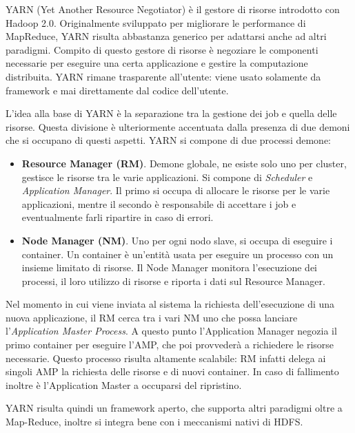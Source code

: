 YARN (Yet Another Resource Negotiator) è il gestore di risorse introdotto con Hadoop 2.0.
Originalmente sviluppato per migliorare le performance di MapReduce, YARN risulta abbastanza generico per adattarsi anche ad altri paradigmi.
Compito di questo gestore di risorse è negoziare le componenti necessarie per eseguire una certa applicazione e gestire la computazione distribuita.
YARN rimane trasparente all'utente: viene usato solamente da framework e mai direttamente dal codice dell'utente.

L'idea alla base di YARN è la separazione tra la gestione dei job e quella delle risorse.
Questa divisione è ulteriormente accentuata dalla presenza di due demoni che si occupano di questi aspetti.
YARN si compone di due processi demone:

\begin{itemize}
    \item \textbf{Resource Manager (RM)}.
    Demone globale, ne esiste solo uno per cluster, gestisce le risorse tra le varie applicazioni.
    Si compone di \textit{Scheduler} e \textit{Application Manager}.
    Il primo si occupa di allocare le risorse per le varie applicazioni, mentre il secondo è responsabile di accettare i job e eventualmente farli ripartire in caso di errori.
    \item \textbf{Node Manager (NM)}.
    Uno per ogni nodo slave, si occupa di eseguire i container.
    Un container è un'entità usata per eseguire un processo con un insieme limitato di risorse.
    Il Node Manager monitora l'esecuzione dei processi, il loro utilizzo di risorse e riporta i dati sul Resource Manager.
\end{itemize}

Nel momento in cui viene inviata al sistema la richiesta dell'esecuzione di una nuova applicazione, il RM cerca tra i vari NM uno che possa lanciare l'\textit{Application Master Process}.
A questo punto l'Application Manager negozia il primo container per eseguire l'AMP, che poi provvederà a richiedere le risorse necessarie.
Questo processo risulta altamente scalabile: RM infatti delega ai singoli AMP la richiesta delle risorse e di nuovi container.
In caso di fallimento inoltre è l'Application Master a occuparsi del ripristino.

YARN risulta quindi un framework aperto, che supporta altri paradigmi oltre a Map-Reduce, inoltre si integra bene con i meccanismi nativi di HDFS.